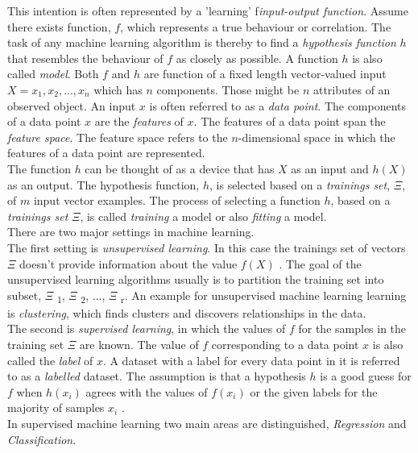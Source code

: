 This intention is often represented by a 'learning' f\emph{input-output function}. Assume there exists function, $f$, which represents a true behaviour or correlation. The task of any machine learning algorithm is thereby to find a \emph{hypothesis function} $h$ that resembles the behaviour of $f$ as closely as possible. A function $h$ is also called \emph{model}. Both $f$ and $h$ are function of a fixed length vector-valued input $X={x_1, x_2, ... , x_n}$ which has $n$ components. Those might be $n$ attributes of an observed object. An input $x$ is often referred to as a \emph{data point}. The components of a data point $x$ are the \emph{features} of $x$. 
The features of a data point span the \emph{feature space}. The feature space refers to the $n$-dimensional space in which the features of a data point are represented.
\\
The function $h$ can be thought of as a device that has $X$ as an input and $h(X)$ as an output. The hypothesis function, $h$, is selected based on a \emph{trainings set}, $\Xi$, of $m$ input vector examples. The process of selecting a function $h$, based on a \emph{trainings set} $\Xi$, is called \emph{training} a model or also \emph{fitting} a model.
\\
There are two major settings in machine learning. 
\\
The first setting is \emph{unsupervised learning}. In this case the trainings set of vectors $\Xi$ doesn't provide information about the value $f(X)$ . The goal of the unsupervised learning algorithms usually is to partition the training set into subset, $\Xi$ \textsubscript{1}, $\Xi$ \textsubscript{2}, ..., $\Xi$ \textsubscript{r}. An example for unsupervised machine learning learning is \emph{clustering}, which finds clusters and discovers relationships in the data.
\\
The second is  \emph{supervised learning}, in which the values of $f$ for the samples in the training set $\Xi$ are known. The value of $f$ corresponding to a data point $x$ is also called the \emph{label} of $x$. A dataset with a label for every data point in it is referred to as a \emph{labelled} dataset. The assumption is that a hypothesis $h$ is a good guess for $f$ when $h(x_i)$ agrees with the values of $f(x_i)$ or the given labels for the majority of samples $x_i$ .
\\
In supervised machine learning two main areas are distinguished, \emph{Regression} and \emph{Classification}. 
